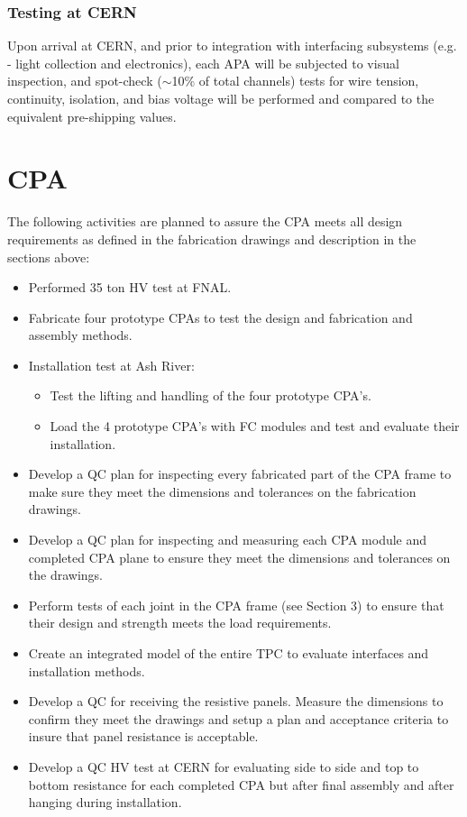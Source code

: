 \subsubsection{Testing at CERN}

Upon arrival at CERN, and prior to integration with interfacing subsystems (e.g. - light collection and electronics), each APA will be subjected to visual inspection, and spot-check ($\sim$10$\%$ of total channels) tests for wire tension, continuity, isolation, and bias voltage will be performed and compared to the equivalent pre-shipping values.




\section{CPA}

The following activities are planned to assure the CPA meets all design requirements as defined in the fabrication drawings and description in the sections above:
\begin{itemize}
\item Performed 35 ton HV test at FNAL.
\item Fabricate four prototype CPAs to test the design and fabrication and assembly methods.
\item Installation test at Ash River:
\begin{itemize}
\item Test the lifting and handling of the four prototype CPA's.
\item  Load the 4 prototype CPA's with FC modules and test and evaluate their installation.
\end{itemize}
\item Develop a QC plan for inspecting every fabricated part of the CPA frame to make sure they meet the dimensions and tolerances on the fabrication drawings.
\item Develop a QC plan for inspecting and measuring each CPA module and completed CPA plane to ensure they meet the dimensions and tolerances on the drawings.
\item Perform tests of each joint in the CPA frame (see Section 3) to ensure that their design and strength meets the load requirements.
\item Create an integrated model of the entire TPC to evaluate interfaces and installation methods.  
\item Develop a QC for receiving the resistive panels.  Measure the dimensions to confirm they meet the drawings and setup a plan and acceptance criteria to insure that panel resistance is acceptable.
\item Develop a QC  HV test at CERN for evaluating side to side and top to bottom resistance for each completed CPA but after final assembly and after hanging during installation.  
\end{itemize}

